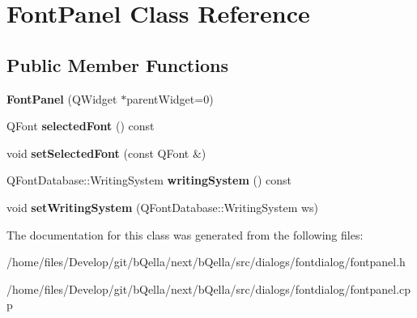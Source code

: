 \hypertarget{classFontPanel}{
\section{FontPanel Class Reference}
\label{classFontPanel}
}
\subsection*{Public Member Functions}
\begin{DoxyCompactItemize}
\item 
\hypertarget{classFontPanel_a619f0481e323d4e08341f56d2e9d73fd}{
{\bfseries FontPanel} (QWidget $\ast$parentWidget=0)}
\label{classFontPanel_a619f0481e323d4e08341f56d2e9d73fd}

\item 
\hypertarget{classFontPanel_a4598687d2083dc9eea8bd012f8089235}{
QFont {\bfseries selectedFont} () const }
\label{classFontPanel_a4598687d2083dc9eea8bd012f8089235}

\item 
\hypertarget{classFontPanel_af498cce9847994fcdb2464c80eed24a1}{
void {\bfseries setSelectedFont} (const QFont \&)}
\label{classFontPanel_af498cce9847994fcdb2464c80eed24a1}

\item 
\hypertarget{classFontPanel_ac42d5fbdb50d33dac8271e60f6188a6b}{
QFontDatabase::WritingSystem {\bfseries writingSystem} () const }
\label{classFontPanel_ac42d5fbdb50d33dac8271e60f6188a6b}

\item 
\hypertarget{classFontPanel_a4b6d43e745550711d9a4f39a679621be}{
void {\bfseries setWritingSystem} (QFontDatabase::WritingSystem ws)}
\label{classFontPanel_a4b6d43e745550711d9a4f39a679621be}

\end{DoxyCompactItemize}


The documentation for this class was generated from the following files:\begin{DoxyCompactItemize}
\item 
/home/files/Develop/git/bQella/next/bQella/src/dialogs/fontdialog/fontpanel.h\item 
/home/files/Develop/git/bQella/next/bQella/src/dialogs/fontdialog/fontpanel.cpp\end{DoxyCompactItemize}
